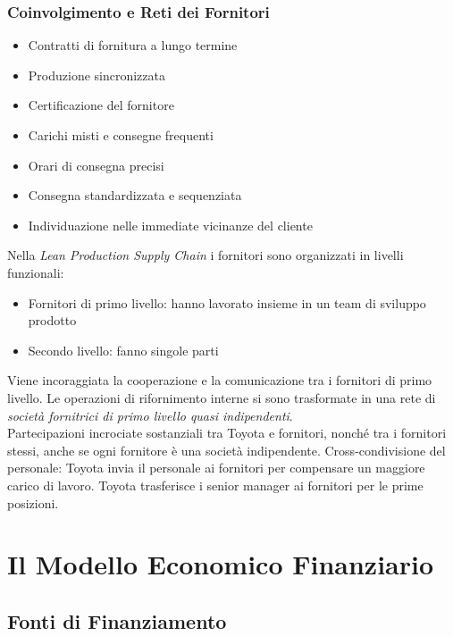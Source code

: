 \documentclass[a4paper,portrait,12pt]{article}
\theoremstyle{definition}
\begin{document}
\subsubsection{Coinvolgimento e Reti dei Fornitori}
\begin{itemize}
\item Contratti di fornitura a lungo termine
\item Produzione sincronizzata
\item Certificazione del fornitore
\item Carichi misti e consegne frequenti
\item Orari di consegna precisi
\item Consegna standardizzata e sequenziata
\item Individuazione nelle immediate vicinanze del cliente
\end{itemize}

Nella \emph{Lean Production Supply Chain} i fornitori sono organizzati in livelli funzionali:
\begin{itemize}
\item Fornitori di primo livello: hanno lavorato insieme in un team di sviluppo prodotto
\item Secondo livello: fanno singole parti
\end{itemize}
Viene incoraggiata la cooperazione e la comunicazione tra i fornitori di primo livello.
Le operazioni di rifornimento interne si sono trasformate in una rete di \emph{società fornitrici di primo livello quasi indipendenti}.\\

Partecipazioni incrociate sostanziali tra Toyota e fornitori, nonché tra i fornitori stessi, anche se ogni fornitore è una società indipendente.
Cross-condivisione del personale: Toyota invia il personale ai fornitori per compensare un maggiore carico di lavoro.
Toyota trasferisce i senior manager ai fornitori per le prime posizioni.



\newpage
\section{Il Modello Economico Finanziario}



\subsection{Fonti di Finanziamento}
\end{document}
